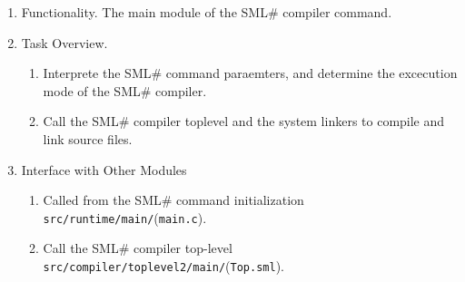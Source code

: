 \documentclass{jbook}
\newif\ifjp
\newcommand{\smlsharp}{SML\#}
\newcommand{\code}[1]{\mbox{\large\tt #1}}
\newcommand{\module}[2]{\code{#1}(\code{#2})}
\begin{document}
\ifjp%
\begin{enumerate}
\item ソースロケーション
\code{src/compiler/main}以下のファイルおよび
\code{src/config/main/Config.sml}．

\item 機能概要
	\smlsharp{}コンパイラコマンドとしてのメインモジュール
\item 処理概要
\begin{enumerate}
\item \smlsharp{}コマンドパラメタを解釈し，smlsharp{}の実行モードを決定する．
\item \smlsharp{}コンパイラのトップモジュールやシステムリンカを呼び出し，
コンパイルやリンクを行う．
\end{enumerate}
\item 他モジュールとのインターフェイス
\begin{enumerate}
\item \smlsharp{}コマンドの初期化処理\module{src/runtime/main/}{main.c}から呼び出される．
\item \smlsharp{}コンパイラのトップレベル
\module{src/compiler/toplevel2/main/}{Top.sml}を呼び出す．
\end{enumerate}
\end{enumerate}
\else%
\begin{enumerate}
\item Functionality.
	The main module of the \smlsharp{} compiler command.
\item Task Overview.
\begin{enumerate}
\item Interprete the \smlsharp{} command paraemters, and  determine the
excecution mode of the \smlsharp{} compiler.
\item Call the \smlsharp{} compiler toplevel and the system linkers
to compile and link source files.
\end{enumerate}
\item Interface with Other Modules
\begin{enumerate}
\item Called from the \smlsharp{} command initialization \module{src/runtime/main/}{main.c}.
\item Call the \smlsharp{} compiler top-level
\module{src/compiler/toplevel2/main/}{Top.sml}.
\end{enumerate}
\end{enumerate}
\fi%
\end{document}
